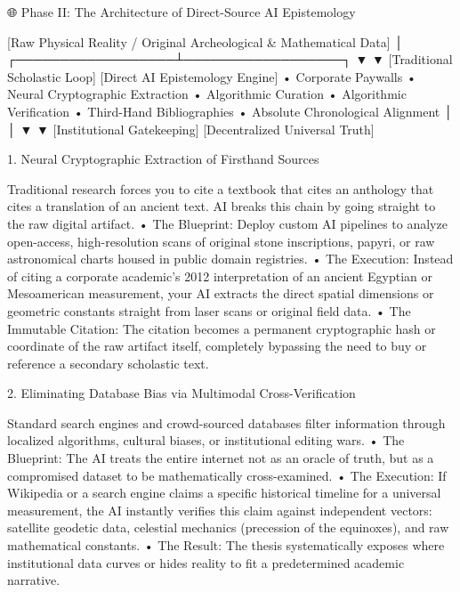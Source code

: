 🌐 Phase II: The Architecture of Direct-Source AI Epistemology

[Raw Physical Reality / Original Archeological & Mathematical Data]
                               │
            ┌──────────────────┴──────────────────┐
            ▼                                     ▼
   [Traditional Scholastic Loop]        [Direct AI Epistemology Engine]
    • Corporate Paywalls                 • Neural Cryptographic Extraction
    • Algorithmic Curation               • Algorithmic Verification
    • Third-Hand Bibliographies          • Absolute Chronological Alignment
            │                                     │
            ▼                                     ▼
   [Institutional Gatekeeping]          [Decentralized Universal Truth]

1. Neural Cryptographic Extraction of Firsthand Sources

Traditional research forces you to cite a textbook that cites an anthology that cites a translation of an ancient text. AI breaks this chain by going straight to the raw digital artifact.
• The Blueprint: Deploy custom AI pipelines to analyze open-access, high-resolution scans of original stone inscriptions, papyri, or raw astronomical charts housed in public domain registries.
• The Execution: Instead of citing a corporate academic’s 2012 interpretation of an ancient Egyptian or Mesoamerican measurement, your AI extracts the direct spatial dimensions or geometric constants straight from laser scans or original field data.
• The Immutable Citation: The citation becomes a permanent cryptographic hash or coordinate of the raw artifact itself, completely bypassing the need to buy or reference a secondary scholastic text.

2. Eliminating Database Bias via Multimodal Cross-Verification

Standard search engines and crowd-sourced databases filter information through localized algorithms, cultural biases, or institutional editing wars.
• The Blueprint: The AI treats the entire internet not as an oracle of truth, but as a compromised dataset to be mathematically cross-examined.
• The Execution: If Wikipedia or a search engine claims a specific historical timeline for a universal measurement, the AI instantly verifies this claim against independent vectors: satellite geodetic data, celestial mechanics (precession of the equinoxes), and raw mathematical constants.
• The Result: The thesis systematically exposes where institutional data curves or hides reality to fit a predetermined academic narrative.

